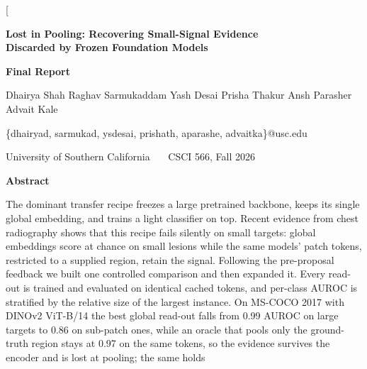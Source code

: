 \documentclass[10pt,letterpaper,twocolumn]{article}
\begin{document}
\makeatletter
\twocolumn[
\begin{@twocolumnfalse}
\begin{center}
  {\LARGE\bfseries Lost in Pooling: Recovering Small-Signal Evidence\\[3pt]
   Discarded by Frozen Foundation Models\par}
  \vspace{5pt}
  {\large\bfseries Final Report\par}
  \vspace{12pt}
  {\normalsize Dhairya Shah \quad Raghav Sarmukaddam \quad Yash Desai \quad
  Prisha Thakur \quad Ansh Parasher \quad Advait Kale\par}
  \vspace{4pt}
  {\small\ttfamily \{dhairyad, sarmukad, ysdesai, prishath, aparashe, advaitka\}@usc.edu\par}
  \vspace{4pt}
  {\small University of Southern California \ \textbullet\ \ CSCI 566, Fall 2026\par}
  \vspace{16pt}
  {\normalsize\bfseries Abstract\par}
  \vspace{4pt}
\end{center}
\begin{list}{}{\setlength{\leftmargin}{0.55in}\setlength{\rightmargin}{0.55in}}\item\relax
\noindent
The dominant transfer recipe freezes a large pretrained backbone, keeps its single global
embedding, and trains a light classifier on top. Recent evidence from chest radiography shows
that this recipe fails silently on small targets: global embeddings score at chance on small
lesions while the same models' patch tokens, restricted to a supplied region, retain the
signal. Following the pre-proposal feedback we built one controlled comparison and then
expanded it. Every read-out is trained and evaluated on identical cached tokens, and
per-class AUROC is stratified by the relative size of the largest instance. On MS-COCO 2017
with DINOv2 ViT-B/14 the best global read-out falls from 0.99 AUROC on large targets to 0.86
on sub-patch ones, while an oracle that pools only the ground-truth region stays at 0.97 on
the same tokens, so the evidence survives the encoder and is lost at pooling; the same holds

\end{list}
\end{@twocolumnfalse}
\end{document}
